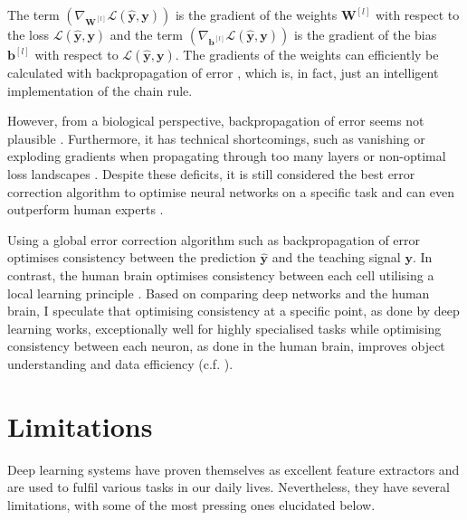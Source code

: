 %
The term $\left( \nabla_{\boldsymbol{W}^{[l]}} \mathcal{L}(\boldsymbol{\hat{y}}, \boldsymbol{y}) \right)$ is the gradient of the weights $\boldsymbol{W}^{[l]}$  with respect to the loss $\mathcal{L}(\boldsymbol{\hat{y}}, \boldsymbol{y})$ and the term $\left( \nabla_{\boldsymbol{b}^{[l]}} \mathcal{L}(\boldsymbol{\hat{y}}, \boldsymbol{y}) \right)$ is the gradient of the bias \(\boldsymbol{b}^{[l]}\)  with respect to $\mathcal{L}(\boldsymbol{\hat{y}}, \boldsymbol{y})$.
The gradients of the weights can efficiently be calculated with backpropagation of error , which is, in fact, just an intelligent implementation of the chain rule.

However, from a biological perspective, backpropagation of error seems not plausible .
Furthermore, it has technical shortcomings, such as vanishing or exploding gradients when propagating through too many layers  or non-optimal loss landscapes .
Despite these deficits, it is still considered the best error correction algorithm to optimise neural networks on a specific task and can even outperform human experts .

Using a global error correction algorithm such as backpropagation of error optimises consistency between the prediction $\boldsymbol{\hat{y}}$ and the teaching signal $\boldsymbol{y}$.
In contrast, the human brain optimises consistency between each cell utilising a local learning principle . 
Based on comparing deep networks and the human brain, I speculate that optimising consistency at a specific point, as done by deep learning works, exceptionally well for highly specialised tasks while optimising consistency between each neuron, as done in the human brain, improves object understanding and data efficiency (c.f. ).

\section{Limitations}
Deep learning systems have proven themselves as excellent feature extractors and are used to fulfil various tasks in our daily lives.
Nevertheless, they have several limitations, with some of the most pressing ones elucidated below.

